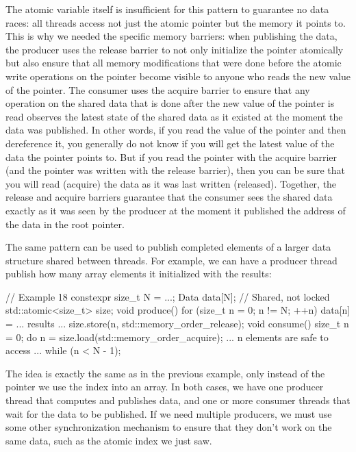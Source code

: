The atomic variable itself is insufficient for this pattern to guarantee no data races: all threads access not just the atomic pointer but the memory it points to. This is why we needed the specific memory barriers: when publishing the data, the producer uses the release barrier to not only initialize the pointer atomically but also ensure that all memory modifications that were done before the atomic write operations on the pointer become visible to anyone who reads the new value of the pointer. The consumer uses the acquire barrier to ensure that any operation on the shared data that is done after the new value of the pointer is read observes the latest state of the shared data as it existed at the moment the data was published. In other words, if you read the value of the pointer and then dereference it, you generally do not know if you will get the latest value of the data the pointer points to. But if you read the pointer with the acquire barrier (and the pointer was written with the release barrier), then you can be sure that you will read (acquire) the data as it was last written (released). Together, the release and acquire barriers guarantee that the consumer sees the shared data exactly as it was seen by the producer at the moment it published the address of the data in the root pointer.

The same pattern can be used to publish completed elements of a larger data structure shared between threads. For example, we can have a producer thread publish how many array elements it initialized with the results:

\begin{code}
// Example 18
constexpr size_t N = ...;
Data data[N];     // Shared, not locked
std::atomic<size_t> size;
void produce() {
  for (size_t n = 0; n != N; ++n) {
    data[n] = ... results ...
    size.store(n, std::memory_order_release);
  }
}
void consume() {
  size_t n = 0;
  do {
    n = size.load(std::memory_order_acquire);
    ... n elements are safe to access ...
  } while (n < N - 1);
}
\end{code}

The idea is exactly the same as in the previous example, only instead of the pointer we use the index into an array. In both cases, we have one producer thread that computes and publishes data, and one or more consumer threads that wait for the data to be published. If we need multiple producers, we must use some other synchronization mechanism to ensure that they don't work on the same data, such as the atomic index we just saw.

